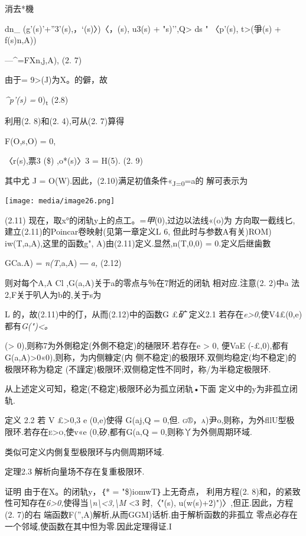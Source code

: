 \documentclass{article}
\begin{document}
消去*機

dn\_ {(g'(s)\textbar{}'+''3'(s),，`(s)〉)〈，(s), u3(s) +
"s)'',Q\textgreater{}} ds " 〈p'(s), t\textgreater{}(爭(s) + f(s)n,A))

---\^{}=FXn,j,A), (2. 7)

由于= 9\textgreater{}(J)为X。的僻，故

\emph{\^{}p'(s) =} 0)\textsubscript{t} (2.8)

利用(2. 8)和(2. 4),可从(2. 7)算得

F(O,s,O) = 0,

〈r(s),票3 (\$) ,o*(s)〉3 = H(5). (2. 9)

其中尤 J =
O(W).因此，(2.10)满足初值条件«\textbar{}\textsubscript{J=0}=a的
解可表示为

\texttt{[image: media/image26.png]}

(2.11) 现在，取x°的闭轨y上的点工。=\emph{甲}(0),过边以法线«(o)为
方向取一截线匕,建立(2.11)的Poincar卷映射(见第一章定义L 6,
但此时与参数A有关)ROM) iw(T,a,A),这里的函数g",
A)由(2.11)定义.显然,n(T,0,0) = 0.定义后继歯數

GCa.A) = \emph{n(T},a,A) ― \emph{a,} (2.12)

则对每个A,\textbar{}A\textbar{} Cl ,G(a,A)关于a的零点与％在7附近的闭轨
相对应.注意(2. 2)中a 法2,F关于叭人为b的,关于s为

L 的，故(2.11)中的仃，从而(2.12)中的函数G £\emph{矿} 定义2.1
若存在\emph{e\textgreater{}0,}使V4£(0,e)都有\emph{G(")\textless{}。}

(\textgreater{} 0),则称7为外側稳定(外側不稳定)的樋限环.若存在e
\textgreater{} 0, 便VaE
(-£,0),都有G(a,A)\textgreater{}0«0),则称，为内侧糠定(内
侧不稳定)的极限环.双侧均稳定(均不稳定)的极限环称为稳定
(不謹定)极限环;双侧稳定性不同时，称/为半稳定极限环.

从上述定义可知，稳定(不稳定)极限环必为孤立闭轨•下面
定义中的y为非孤立闭轨.

定义 2.2 若 V £\textgreater{}0,3 e (0,e)使得 G(aj,Q = 0,但.
\textsc{g®，a)}尹o,则称，为外fllU型极限环.若存在\textsc{e\textgreater{}o,}使v«e
(0,矽,都有G(a,Q = 0,则称丫为外侧周期环域.

类似可定义内側复型极限环与内侧周期环域.

定理2.3 解析向量场不存在复重极限环.

证明 由于在X。的闭轨y，｛* = "\$)iomwT｝上无奇点， 利用方程(2.
8)和，的紧致性可知存在\emph{6\textgreater{}0,}使得当\emph{\textbackslash{}n\textbackslash{}\textless{}3,\textbackslash{}M}
\textless{}3 时,〈"(s), u(w(s)+2)")〉,但正.因此，方程(2. 7)的右
端函数F('',A)解析,从而GGM)话析.由于解析函数的非孤立
零点必存在一个邻域,使函数在其中怛为零.因此定理得证.I
\end{document}
